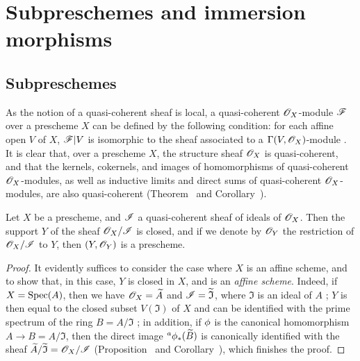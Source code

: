 \section{Subpreschemes and immersion morphisms}
\label{section:I.4}

\subsection{Subpreschemes}
\label{subsection:I.4.1}

\begin{env}[4.1.1]
\label{I.4.1.1}
As the notion of a quasi-coherent sheaf  is local, a quasi-coherent $\mathscr{O}_X$-module $\mathscr{F}$ over a prescheme $X$ can be defined by the following condition: for each affine open $V$ of $X$, $\mathscr{F}|V$ is isomorphic to the sheaf associated to a $\Gamma(V,\mathscr{O}_X)$-module .
It is clear that, over a prescheme $X$, the structure sheaf $\mathscr{O}_X$ is quasi-coherent, and that the kernels, cokernels, and images of homomorphisms of quasi-coherent $\mathscr{O}_X$-modules, as well as inductive limits and direct sums of quasi-coherent $\mathscr{O}_X$-modules, are also quasi-coherent (Theorem~ and Corollary~).
\end{env}

\begin{proposition}[4.1.2]
\label{I.4.1.2}
Let $X$ be a prescheme, and $\mathscr{I}$ a quasi-coherent sheaf of ideals of $\mathscr{O}_X$.
Then the support $Y$ of the sheaf $\mathscr{O}_X/\mathscr{I}$ is closed, and if we denote by $\mathscr{O}_Y$ the restriction of $\mathscr{O}_X/\mathscr{I}$ to $Y$, then $(Y,\mathscr{O}_Y)$ is a prescheme.
\end{proposition}

\begin{proof}
\label{proof-I.4.1.2}
It evidently suffices  to consider the case where $X$ is an affine scheme, and to show that, in this case, $Y$ is closed in $X$, and is an \emph{affine scheme}.
Indeed, if $X=\operatorname{Spec}(A)$, then we have $\mathscr{O}_X=\widetilde{A}$ and $\mathscr{I}=\widetilde{\mathfrak{I}}$, where $\mathfrak{I}$ is an ideal of $A$ ;
$Y$ is then equal to the closed subset $V(\mathfrak{I})$ of $X$ and can be identified with the prime spectrum of the ring $B=A/\mathfrak{I}$ ;
in addition, if $\phi$ is the canonical homomorphism $A\to B=A/\mathfrak{I}$, then the direct image ${}^a\phi_*(\widetilde{B})$ is canonically identified with the sheaf $\widetilde{A}/\widetilde{\mathfrak{I}}=\mathscr{O}_X/\mathscr{I}$ (Proposition~ and Corollary~), which finishes the proof.
\end{proof}

